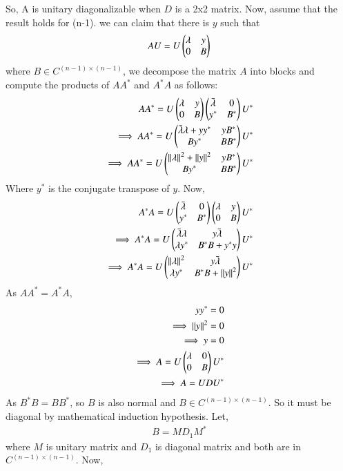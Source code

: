 \documentclass[journal,12pt,twocolumn]{IEEEtran}
\begin{document}
So, A is unitary diagonalizable when $D$ is a 2x2 matrix.
Now, assume that the result holds for (n-1). we can claim that there is $y$ such that 
\begin{align}
AU = U\begin{pmatrix}\lambda & y\\0 & B\end{pmatrix}
\end{align}
where $B \in C^{(n-1)\times(n-1)}$, we decompose the matrix $A$ into blocks and compute the products of $A A^*$ and $A^* A$ as follows:
\begin{align}
A A^* =  U \begin{pmatrix}\lambda & y\\0 & B\end{pmatrix}\begin{pmatrix}\bar{\lambda} & 0\\y^* & B^*\end{pmatrix}U^*\\
\implies A A^* =  U \begin{pmatrix}\bar{\lambda}\lambda + yy^* & yB^*\\By^* & BB^*\end{pmatrix} U^*\\
\implies A A^* = U \begin{pmatrix}\left\lVert\lambda\right\rVert^2 + \left\lVert y\right\rVert^2 & y B^*\\By^* & BB^*\end{pmatrix} U^*
\end{align}
Where $y^*$ is the conjugate transpose of $y$.
Now,
\begin{align}
A^* A = U \begin{pmatrix}\bar{\lambda} & 0\\y^* & B^*\end{pmatrix}\begin{pmatrix}\lambda & y\\0 & B\end{pmatrix}U^*\\
\implies A^* A =  U \begin{pmatrix}\bar{\lambda}\lambda & y \bar{\lambda}\\\lambda y^* & B^*B + y^*y\end{pmatrix} U^*\\
\implies A^* A =U \begin{pmatrix}\left\lVert\lambda\right\rVert^2 & y \bar{\lambda}\\\lambda y^* & B^*B + \left\lVert y\right\rVert^2\end{pmatrix} U^*
\end{align}
As $A A^* = A^* A$, 
\begin{align}
y y^* = 0\\
\implies \left\lVert y\right\rVert^2 = 0\\
\implies y =0\\
\implies A = U \begin{pmatrix}\lambda & 0\\0 & B\end{pmatrix} U^*\\
\implies A = U D U^*
\end{align}
As $B^* B = B B^*$, so $B$ is also normal and $B \in C^{(n-1)\times(n-1)}$. So it must be diagonal by mathematical induction hypothesis.
Let, 
\begin{align}
B = M D_1 M^*
\end{align}
where $M$ is unitary matrix and $D_1$ is diagonal matrix and both are in $C^{(n-1)\times(n-1)}$.
Now,
\end{document}
